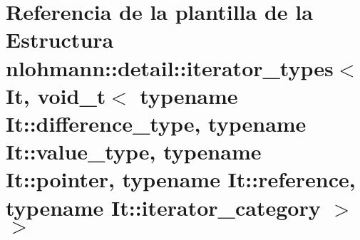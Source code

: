 \hypertarget{structnlohmann_1_1detail_1_1iterator__types_3_01It_00_01void__t_3_01typename_01It_1_1difference_d2be8685966c97e00e99d4fd2366dc0b}{}\section{Referencia de la plantilla de la Estructura nlohmann\+:\+:detail\+:\+:iterator\+\_\+types$<$ It, void\+\_\+t$<$ typename It\+:\+:difference\+\_\+type, typename It\+:\+:value\+\_\+type, typename It\+:\+:pointer, typename It\+:\+:reference, typename It\+:\+:iterator\+\_\+category $>$ $>$}
\label{structnlohmann_1_1detail_1_1iterator__types_3_01It_00_01void__t_3_01typename_01It_1_1difference_d2be8685966c97e00e99d4fd2366dc0b}
